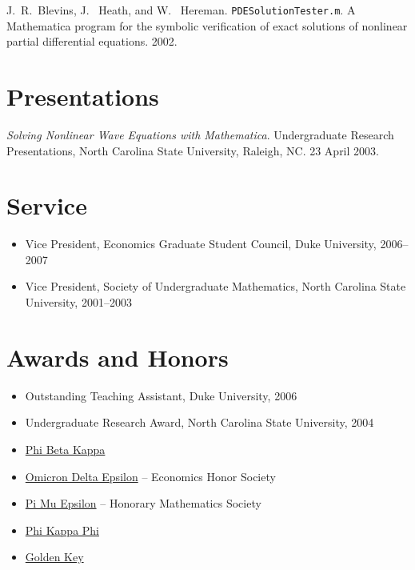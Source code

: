 \documentclass[overlapped,line,final,11pt,letterpaper]{res}
\begin{document}
\begin{resume}
J.\ R.\ Blevins, J. \ Heath, and W. \
Hereman. \texttt{PDESolutionTester.m}.  A Mathematica program for the
symbolic verification of exact solutions of nonlinear partial
differential equations. 2002.


\section{\bf Presentations}

{\em Solving Nonlinear Wave Equations with Mathematica}. Undergraduate
Research Presentations, North Carolina State University, Raleigh,
NC. 23 April 2003.


\section{\bf Service}

\begin{itemize}
\item Vice President, Economics Graduate Student Council, Duke
  University, 2006--2007
\item Vice President, Society of Undergraduate Mathematics, North
  Carolina State University, 2001--2003
\end{itemize}


\section{\bf Awards and Honors}
\begin{itemize}
\item Outstanding Teaching Assistant, Duke University, 2006
\item Undergraduate Research Award, North Carolina State University, 2004
\item \href{http://www.pbk.org/}{Phi Beta Kappa}
\item \href{http://www.cba.ua.edu/~ode/}
  {Omicron Delta Epsilon} -- Economics Honor Society
\item \href{http://www.pme-math.org/}
  {Pi Mu Epsilon} -- Honorary Mathematics Society
\item \href{http://www.phikappaphi.org/}{Phi Kappa Phi}
\item \href{http://www.goldenkey.org}{Golden Key}
\end{itemize}


\end{resume}
\end{document}
